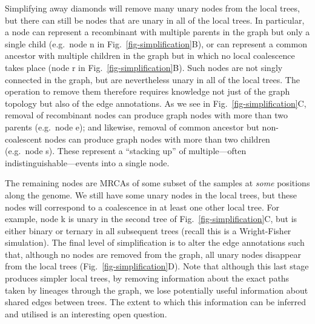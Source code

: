 \documentclass{article}
\begin{document}
Simplifying away diamonds will remove many unary nodes from the
local trees, but there can still be nodes that are unary in all
of the local trees. In particular, a node can represent a recombinant
with multiple parents in the graph but only a single child (e.g.\ node \textsf{n}
in Fig.~\ref{fig-simplification}B), or can represent a common ancestor with
multiple children in the graph but in which no local coalescence takes place
(node \textsf{r} in Fig.~\ref{fig-simplification}B).
Such nodes are not singly connected in the graph, but are nevertheless unary in
all of the local trees.
The operation to remove them
therefore requires knowledge not just of the graph topology but also of the
edge annotations.
As we see in Fig.~\ref{fig-simplification}C,
removal of recombinant nodes can produce graph nodes with
more than two parents (e.g.~node \textsf{e}); and likewise, removal of
common ancestor but non-coalescent nodes can produce graph nodes with
more than two children (e.g.~node \textsf{s}). These represent a ``stacking up'' of
multiple---often indistinguishable---events into a single node.


The remaining nodes are MRCAs of some subset of the samples
at \emph{some} positions along the genome. We still have
some unary nodes in the local trees, but these nodes will
correspond to a coalescence in at least one other
local tree. For example, node  \textsf{k} is unary in the second tree
of Fig.~\ref{fig-simplification}C, but is either binary
or ternary in all subsequent trees (recall this is a Wright-Fisher
simulation). The final level of simplification is to alter the edge annotations
such that, although no nodes are removed from the graph, all
unary nodes disappear from the local trees (Fig.~\ref{fig-simplification}D).
Note that although this last stage produces simpler local trees, by
removing information about the exact paths taken by lineages through
the graph, we lose potentially useful information about shared edges
between trees. The extent to which this information can be inferred
and utilised is an interesting open question.
\end{document}
